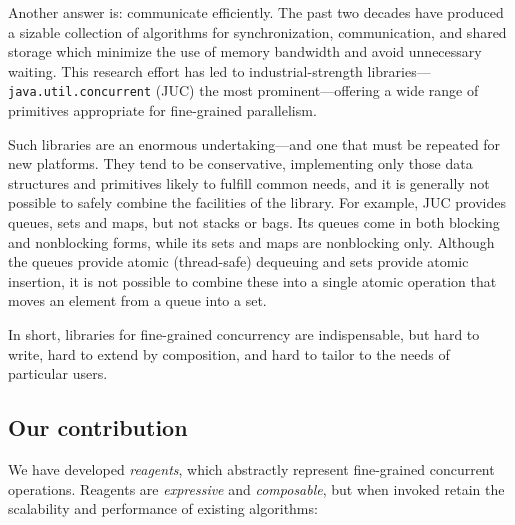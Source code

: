 \documentclass[preprint,nocopyrightspace]{sigplanconf}
\begin{document}
Another answer is: communicate efficiently.  The past two
decades have
produced a sizable collection of algorithms for synchronization, communication,
and shared storage which minimize the use of memory bandwidth and avoid
unnecessary waiting.  This research effort has led to industrial-strength
libraries---\texttt{java.util.concurrent} (JUC) the most prominent---offering a
wide range of primitives appropriate for fine-grained parallelism.

Such libraries are an enormous undertaking---and one that must be repeated for
new platforms.  They tend to be conservative, implementing only those data
structures and primitives likely to fulfill common needs, and it is generally
not possible to safely combine the facilities of the library.  For example,
JUC provides queues, sets and maps, but not stacks or bags.  Its queues come
in both blocking and nonblocking forms, while its sets and maps are
nonblocking only.  Although the queues provide atomic (thread-safe) dequeuing
and sets provide atomic insertion, it is not possible to combine these into a
single atomic operation that moves an element from a queue into a set.

In short, libraries for fine-grained concurrency are indispensable, but hard
to write, hard to extend by composition, and hard to tailor to the needs of
particular users.

\subsection*{Our contribution}





We have developed \emph{reagents}, which abstractly represent fine-grained
concurrent operations.  Reagents are \emph{expressive} and \emph{composable},
but when invoked retain the scalability and performance of existing
algorithms:
\end{document}
